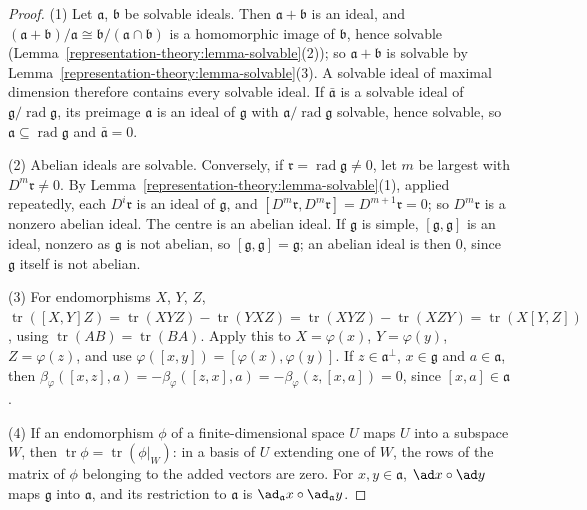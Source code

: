 \begin{proof}
(1) Let $\mathfrak{a}$, $\mathfrak{b}$ be solvable ideals. Then $\mathfrak{a} + \mathfrak{b}$ is an ideal, and $(\mathfrak{a} + \mathfrak{b})/\mathfrak{a} \cong
\mathfrak{b}/(\mathfrak{a} \cap \mathfrak{b})$ is a homomorphic image of $\mathfrak{b}$, hence solvable (Lemma~\ref{representation-theory:lemma-solvable}(2)); so
$\mathfrak{a} + \mathfrak{b}$ is solvable by Lemma~\ref{representation-theory:lemma-solvable}(3). A solvable ideal of maximal dimension therefore contains every solvable
ideal. If $\bar{\mathfrak{a}}$ is a solvable ideal of $\mathfrak{g}/\operatorname{rad}\mathfrak{g}$, its preimage $\mathfrak{a}$ is an ideal of $\mathfrak{g}$ with
$\mathfrak{a}/\operatorname{rad}\mathfrak{g}$ solvable, hence solvable, so $\mathfrak{a} \subseteq \operatorname{rad}\mathfrak{g}$ and $\bar{\mathfrak{a}} = 0$.

(2) Abelian ideals are solvable. Conversely, if $\mathfrak{r} = \operatorname{rad}\mathfrak{g} \neq 0$, let $m$ be largest with $D^m\mathfrak{r} \neq 0$. By
Lemma~\ref{representation-theory:lemma-solvable}(1), applied repeatedly, each $D^i\mathfrak{r}$ is an ideal of $\mathfrak{g}$, and
$[D^m\mathfrak{r}, D^m\mathfrak{r}] = D^{m+1}\mathfrak{r} = 0$; so $D^m\mathfrak{r}$ is a nonzero abelian ideal. The centre is an abelian ideal. If $\mathfrak{g}$ is simple,
$[\mathfrak{g}, \mathfrak{g}]$ is an ideal, nonzero as $\mathfrak{g}$ is not abelian, so $[\mathfrak{g}, \mathfrak{g}] = \mathfrak{g}$; an abelian ideal is then $0$, since
$\mathfrak{g}$ itself is not abelian.

(3) For endomorphisms $X$, $Y$, $Z$, $\operatorname{tr}([X, Y]Z) = \operatorname{tr}(XYZ) - \operatorname{tr}(YXZ) = \operatorname{tr}(XYZ) - \operatorname{tr}(XZY)
= \operatorname{tr}(X[Y, Z])$, using $\operatorname{tr}(AB) = \operatorname{tr}(BA)$. Apply this to $X = \varphi(x)$, $Y = \varphi(y)$, $Z = \varphi(z)$, and use
$\varphi([x, y]) = [\varphi(x), \varphi(y)]$. If $z \in \mathfrak{a}^\perp$, $x \in \mathfrak{g}$ and $a \in \mathfrak{a}$, then
$\beta_\varphi([x, z], a) = -\beta_\varphi([z, x], a) = -\beta_\varphi(z, [x, a]) = 0$, since $[x, a] \in \mathfrak{a}$.

(4) If an endomorphism $\phi$ of a finite-dimensional space $U$ maps $U$ into a subspace $W$, then $\operatorname{tr}\phi = \operatorname{tr}(\phi|_W)$: in a basis of $U$
extending one of $W$, the rows of the matrix of $\phi$ belonging to the added vectors are zero. For $x, y \in \mathfrak{a}$, $\ad x \circ \ad y$ maps $\mathfrak{g}$ into
$\mathfrak{a}$, and its restriction to $\mathfrak{a}$ is $\ad_{\mathfrak{a}}x \circ \ad_{\mathfrak{a}}y$.
\end{proof}

